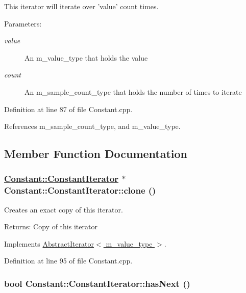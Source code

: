 This iterator will iterate over 'value' count times. \begin{Desc}
\item[Parameters:]
\begin{description}
\item[{\em value}]An m\_\-value\_\-type that holds the value \item[{\em count}]An m\_\-sample\_\-count\_\-type that holds the number of times to iterate \end{description}
\end{Desc}


Definition at line 87 of file Constant.cpp.

References m\_\-sample\_\-count\_\-type, and m\_\-value\_\-type.

\subsection{Member Function Documentation}
\hypertarget{classConstant_1_1ConstantIterator_a1}{
\subsubsection[clone]{\setlength{\rightskip}{0pt plus 5cm}\hyperlink{classConstant_1_1ConstantIterator}{Constant::Constant\-Iterator} $\ast$ Constant::Constant\-Iterator::clone ()}}
\label{classConstant_1_1ConstantIterator_a1}


Creates an exact copy of this iterator. \begin{Desc}
\item[Returns:]Copy of this iterator \end{Desc}


Implements \hyperlink{classAbstractIterator_a0}{Abstract\-Iterator$<$ m\_\-value\_\-type $>$}.

Definition at line 95 of file Constant.cpp.\hypertarget{classConstant_1_1ConstantIterator_a2}{
\subsubsection[hasNext]{\setlength{\rightskip}{0pt plus 5cm}bool Constant::Constant\-Iterator::has\-Next ()}}
\label{classConstant_1_1ConstantIterator_a2}


